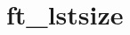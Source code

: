 \chapter{ft\+\_\+lstsize}
\hypertarget{md_Documentation_2ft__lstsize}{}\label{md_Documentation_2ft__lstsize}
